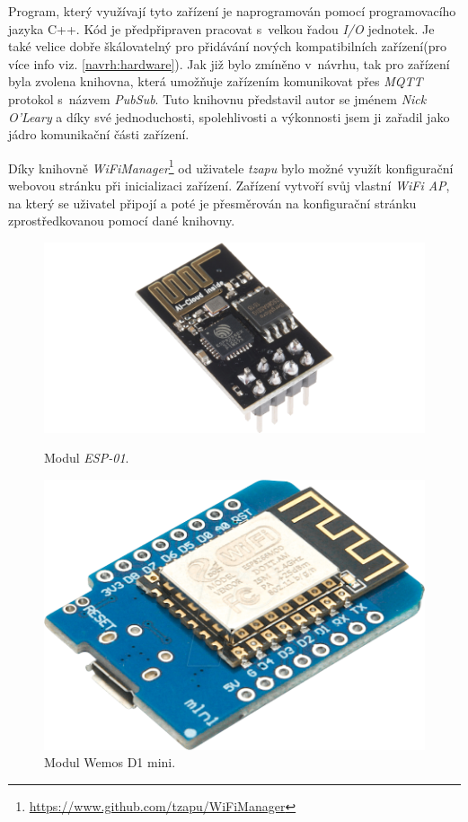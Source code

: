 Program, který využívají tyto zařízení je naprogramován pomocí programovacího jazyka C++.
Kód je předpřipraven pracovat s~velkou řadou \emph{I/O} jednotek.
Je také velice dobře škálovatelný pro přidávání nových kompatibilních zařízení(pro více info viz. \ref{navrh:hardware}).
Jak již bylo zmíněno v~návrhu, tak pro zařízení byla zvolena knihovna, která umožňuje zařízením komunikovat přes \emph{MQTT} protokol s~názvem \emph{PubSub}.
Tuto knihovnu představil autor se jménem \emph{Nick O'Leary} a díky své jednoduchosti, spolehlivosti a výkonnosti jsem ji zařadil jako jádro komunikační části zařízení.

Díky knihovně \emph{WiFiManager}\footnote{\url{https://www.github.com/tzapu/WiFiManager}} od uživatele \emph{tzapu} bylo možné využít konfigurační webovou stránku při inicializaci zařízení.
Zařízení vytvoří svůj vlastní \emph{WiFi AP}, na který se uživatel připojí a poté je přesměrován na konfigurační stránku zprostředkovanou pomocí dané knihovny.

\begin{figure}[hbt]
  \centering
  \includegraphics[width=.8\linewidth]{obrazky-figures/esp-01.png}
  \caption{Modul \emph{ESP-01}.~\cite{esp01}}
  \label{figure:esp01}
  \endminipage

  \hfill
  \centering
  \includegraphics[width=.7\linewidth]{obrazky-figures/wemos.png}
  \caption{Modul Wemos D1 mini.~\cite{wemosFigure}}
  \label{figure:wemos}
  \endminipage
\end{figure}

